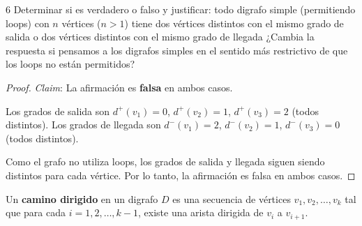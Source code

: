 \begin{ejercicio}{6}
	Determinar si es verdadero o falso y justificar: todo digrafo simple (permitiendo loops) con \( n \) vértices (\( n > 1 \)) tiene dos vértices distintos con el mismo grado de salida o dos vértices distintos con el mismo grado de llegada ¿Cambia la respuesta si pensamos a los digrafos simples en el sentido más restrictivo de que los loops no están permitidos?
\end{ejercicio}
\begin{proof}
	\emph{Claim}: La afirmación es \textbf{falsa} en ambos casos.

	\begin{center}
	\end{center}

	Los grados de salida son \( d^+(v_1)=0 \), \( d^+(v_2)=1 \), \( d^+(v_3)=2 \) (todos distintos).
	Los grados de llegada son \( d^-(v_1)=2 \), \( d^-(v_2)=1 \), \( d^-(v_3)=0 \) (todos distintos).

	Como el grafo no utiliza loops, los grados de salida y llegada siguen siendo distintos para cada vértice. Por lo tanto, la afirmación es falsa en ambos casos.
\end{proof}

\vspace{0.5cm}

\begin{definition}
	Un \textbf{camino dirigido} en un digrafo \( D \) es una secuencia de vértices \( v_1, v_2, \ldots, v_k \) tal que para cada \( i = 1, 2, \ldots, k-1 \), existe una arista dirigida de \( v_i \) a \( v_{i+1} \).
\end{definition}

